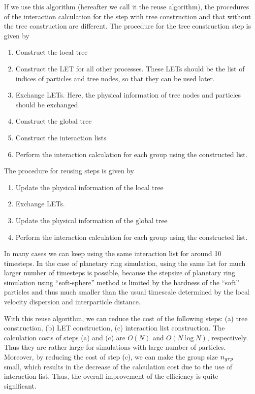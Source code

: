 \documentclass[dvipdfmx]{pasj01}
\begin{document}
If we use this algorithm (hereafter we call it the reuse algorithm),
the procedures of the interaction calculation for the step with tree
construction and that without the tree construction are different. The
procedure for the tree construction step is given by
\begin{enumerate}
\item Construct the local tree
\item Construct the LET for all other processes. These LETs  should be the
  list of indices of particles and tree nodes, so that they can be
  used later.
\item  Exchange LETs. Here, the physical information of tree nodes and
  particles should be exchanged
\item Construct the global tree
\item Construct the interaction lists
\item Perform the interaction calculation for each group using the
  constructed list.  
\end{enumerate}  


The procedure for reusing steps is given by
\begin{enumerate}
\item Update the physical information of the local tree
\item Exchange LETs.
\item Update the physical information of the global tree
\item Perform the interaction calculation for each group using the
  constructed list.  
\end{enumerate}  

In many cases we can keep using the same interaction list for around
10 timesteps. In the case of planetary ring simulation, using the same
list for much larger number of timesteps is possible, because the
stepsize of planetary ring simulation using ``soft-sphere'' method
\citep{Iwasawaetal2018} is limited by the hardness of the ``soft''
particles and thus much smaller than the usual timescale determined by
the local velocity dispersion and interparticle distance.

With this reuse algorithm, we can reduce the cost of the following
steps: (a) tree construction, (b) LET construction, (c) interaction
list construction. The calculation costs of steps (a) and (c) are
$O(N)$ and $O(N \log N)$, respectively. Thus they are rather large for
simulations with large number of particles. Moreover, by reducing the
cost of step (c), we can make the group size $n_{\rm grp}$ small,
which results in the decrease of the calculation cost due to the use
of interaction list. Thus, the overall improvement of the efficiency
is quite significant.
\end{document}
